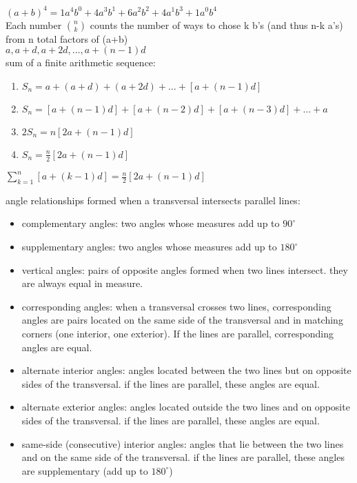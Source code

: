 \documentclass{article}
\begin{document}
$(a + b)^4 = 1a^4b^0 + 4a^3b^1 + 6a^2b^2 + 4a^1b^3 + 1a^0b^4$\\

Each number $\binom{n}{k}$ counts the number of ways to chose k b's (and thus n-k a's) from n total factors of (a+b)\\

$a, a + d, a + 2d, \ldots, a + (n - 1)d$\\

sum of a finite arithmetic sequence:
	\begin{enumerate}
		\item $S_n = a + (a + d) + (a + 2d) + \ldots + [a + (n - 1)d]$ 
		\item $S_n = [a + (n - 1)d] + [a + (n - 2)d] + [a + (n - 3)d] + \ldots + a$
		\item $2S_n = n[2a + (n - 1)d]$ 
		\item $S_n = \frac{n}{2}[2a + (n - 1)d]$
	\end{enumerate}

$\sum_{k = 1}^{n}[a + (k - 1)d] = \frac{n}{2}[2a + (n - 1)d]$

\begin{center}
\end{center}

angle relationships formed when a transversal intersects parallel lines:
	\begin{itemize}
		\item complementary angles: two angles whose measures add up to $90^{\circ}$
		\item supplementary angles: two angles whose measures add up to $180^{\circ}$
		\item vertical angles: pairs of opposite angles formed when two lines intersect. they are always equal in measure.
		\item corresponding angles: when a transversal crosses two lines, corresponding angles are pairs located on the same side of the transversal and in matching corners (one interior, one exterior). If the lines are parallel, corresponding angles are equal.
		\item alternate interior angles: angles located between the two lines but on opposite sides of the transversal. if the lines are parallel, these angles are equal.
		\item alternate exterior angles: angles located outside the two lines and on opposite sides of the transversal. if the lines are parallel, these angles are equal.
		\item same-side (consecutive) interior angles: angles that lie between the two lines and on the same side of the transversal. if the lines are parallel, these angles are supplementary (add up to $180^{\circ}$)
	\end{itemize}
\end{document}
